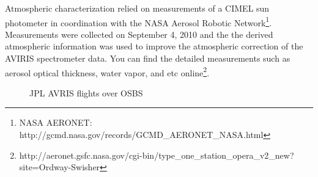 \documentclass[remotesensing,article,accept,moreauthors,pdftex,12pt,a4paper]{mdpi}
\begin{document}
Atmospheric characterization relied on measurements of a CIMEL sun photometer in coordination with the NASA Aerosol Robotic Network\footnote{NASA AERONET: http://gcmd.nasa.gov/records/GCMD\_AERONET\_NASA.html}. Measurements were collected on September 4, 2010 and the the derived atmospheric information was used to improve the atmospheric correction of the AVIRIS spectrometer data. You can find the detailed measurements such as aerosol optical thickness, water vapor, and etc online\footnote{http://aeronet.gsfc.nasa.gov/cgi-bin/type\_one\_station\_opera\_v2\_new?site=Ordway-Swisher}.
 



\begin{figure}[tp]
  \centering
  \hspace{1em}%
  \hspace{1em}%
   \caption{JPL AVRIS flights over OSBS \cite{neon2010aopdatarelease}}
 \label{fig:hyperspectral}
\end{figure}
\end{document}
